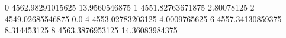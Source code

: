 0 4562.98291015625 13.9560546875
1 4551.82763671875 2.80078125
2 4549.02685546875 0.0
4 4553.02783203125 4.0009765625
6 4557.34130859375 8.314453125
8 4563.3876953125 14.36083984375
